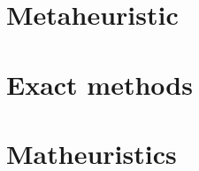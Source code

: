 \documentclass[a4paper,12pt]{report}
\newcommand\blankpage{%
    \null
    \thispagestyle{empty}%
    \addtocounter{page}{-1}%
    \newpage}
\begin{document}
\clearpage{\pagestyle{plain}\cleardoublepage}
\chapter{Metaheuristic}


\clearpage{\pagestyle{plain}\cleardoublepage}
\chapter{Exact methods}


\clearpage{\pagestyle{plain}\cleardoublepage}
\chapter{Matheuristics}


\afterpage{\blankpage}
    
%

\printbibliography
\end{document}
